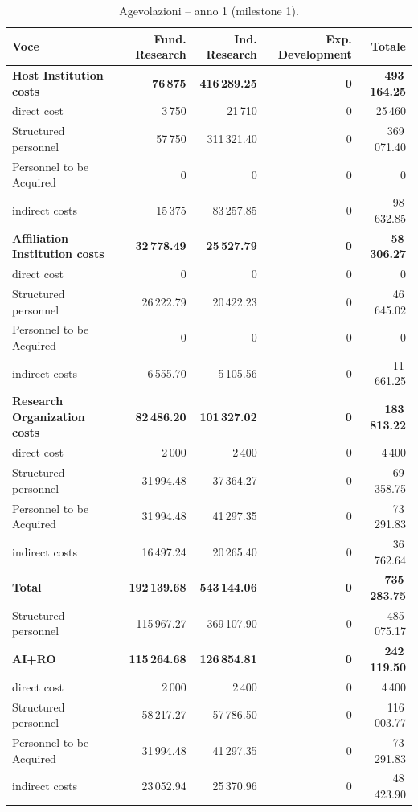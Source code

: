 \documentclass{plan4ari_report}
\begin{document}
\begin{table}[H]\centering\small
\caption{Agevolazioni -- anno 1 (milestone 1).}\label{tab:bpy-a-y1}
\begin{tabular}{lrrrr}\toprule
\textbf{Voce} & \textbf{Fund. Research} & \textbf{Ind. Research} & \textbf{Exp. Development} & \textbf{Totale} \\\midrule
\textbf{Host Institution costs} & \textbf{76\,875} & \textbf{416\,289.25} & \textbf{0} & \textbf{493\,164.25} \\
\quad direct cost & 3\,750 & 21\,710 & 0 & 25\,460 \\
\quad Structured personnel & 57\,750 & 311\,321.40 & 0 & 369\,071.40 \\
\quad Personnel to be Acquired & 0 & 0 & 0 & 0 \\
\quad indirect costs & 15\,375 & 83\,257.85 & 0 & 98\,632.85 \\
\textbf{Affiliation Institution costs} & \textbf{32\,778.49} & \textbf{25\,527.79} & \textbf{0} & \textbf{58\,306.27} \\
\quad direct cost & 0 & 0 & 0 & 0 \\
\quad Structured personnel & 26\,222.79 & 20\,422.23 & 0 & 46\,645.02 \\
\quad Personnel to be Acquired & 0 & 0 & 0 & 0 \\
\quad indirect costs & 6\,555.70 & 5\,105.56 & 0 & 11\,661.25 \\
\textbf{Research Organization costs} & \textbf{82\,486.20} & \textbf{101\,327.02} & \textbf{0} & \textbf{183\,813.22} \\
\quad direct cost & 2\,000 & 2\,400 & 0 & 4\,400 \\
\quad Structured personnel & 31\,994.48 & 37\,364.27 & 0 & 69\,358.75 \\
\quad Personnel to be Acquired & 31\,994.48 & 41\,297.35 & 0 & 73\,291.83 \\
\quad indirect costs & 16\,497.24 & 20\,265.40 & 0 & 36\,762.64 \\
\midrule
\textbf{Total} & \textbf{192\,139.68} & \textbf{543\,144.06} & \textbf{0} & \textbf{735\,283.75} \\
\quad Structured personnel & 115\,967.27 & 369\,107.90 & 0 & 485\,075.17 \\
\textbf{AI+RO} & \textbf{115\,264.68} & \textbf{126\,854.81} & \textbf{0} & \textbf{242\,119.50} \\
\quad direct cost & 2\,000 & 2\,400 & 0 & 4\,400 \\
\quad Structured personnel & 58\,217.27 & 57\,786.50 & 0 & 116\,003.77 \\
\quad Personnel to be Acquired & 31\,994.48 & 41\,297.35 & 0 & 73\,291.83 \\
\quad indirect costs & 23\,052.94 & 25\,370.96 & 0 & 48\,423.90 \\
\bottomrule\end{tabular}
\end{table}
\end{document}
